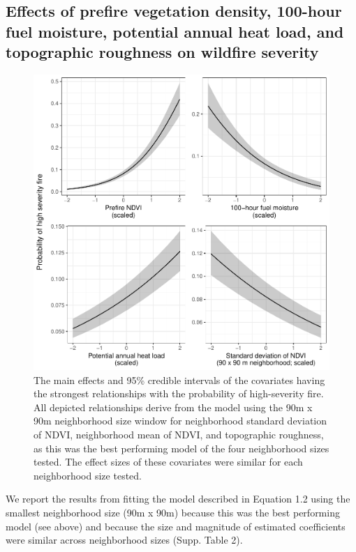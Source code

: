 \documentclass[twoside,12pt,final]{ucthesis-CA2012}
\begin{document}
\begin{ucmainmatter}
\subsection{Effects of prefire vegetation density, 100-hour fuel
moisture, potential annual heat load, and topographic roughness on
wildfire
severity}\label{effects-of-prefire-vegetation-density-100-hour-fuel-moisture-potential-annual-heat-load-and-topographic-roughness-on-wildfire-severity}
\begin{figure}
\centering
\includegraphics[width=6.00000in]{figure/chap01/prob-hi-sev-main-effects-credible-intervals.pdf}
\caption{The main effects and 95\% credible intervals of the covariates
having the strongest relationships with the probability of high-severity
fire. All depicted relationships derive from the model using the 90m x
90m neighborhood size window for neighborhood standard deviation of
NDVI, neighborhood mean of NDVI, and topographic roughness, as this was
the best performing model of the four neighborhood sizes tested. The
effect sizes of these covariates were similar for each neighborhood size
tested.}
\end{figure}
We report the results from fitting the model described in Equation 1.2
using the smallest neighborhood size (90m x 90m) because this was the
best performing model (see above) and because the size and magnitude of
estimated coefficients were similar across neighborhood sizes (Supp.
Table 2).


\end{ucmainmatter}
\end{document}
